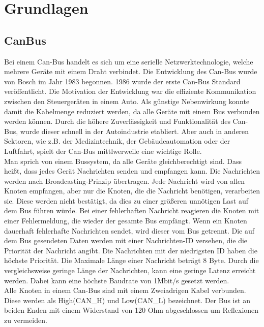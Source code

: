 \chapter{Grundlagen}


\section{CanBus}
Bei einem Can-Bus handelt es sich um eine serielle Netzwerktechnologie, 
welche mehrere Geräte mit einem Draht verbindet.
Die Entwicklung des Can-Bus wurde von Bosch im Jahr 1983 begonnen. 1986 wurde der erste Can-Bus Standard 
veröffentlicht.
Die Motivation der Entwicklung war die effiziente Kommunikation zwischen den Steuergeräten in einem Auto. 
Als günstige
Nebenwirkung konnte damit die Kabelmenge reduziert werden, da alle Geräte mit einem Bus verbunden werden können.
Durch die höhere Zuverlässigkeit und Funktionalität des Can-Bus, wurde dieser schnell in der Autoindustrie etabliert.
Aber auch in anderen Sektoren, wie z.B. der Medizintechnik, der Gebäudeautomation oder der Luftfahrt, spielt der
Can-Bus mittlwerweile eine wichtige Rolle.
\cite[Seiten 2-10]{Voss2008}
\\
Man sprich von einem Bussystem, da alle Geräte gleichberechtigt sind. Dass heißt, dass jedes Gerät Nachrichten 
senden und empfangen kann.
Die Nachrichten werden nach Broadcasting-Prinzip übertragen. Jede Nachricht wird von allen Knoten empfangen, 
aber nur die Knoten, die die Nachricht benötigen, verarbeiten sie. Diese werden nicht bestätigt,
da dies zu einer größeren unnötigen Last auf dem Bus führen würde. Bei einer fehlerhaften Nachricht reagieren
die Knoten mit einer Fehlermeldung, die wieder der gesamte Bus empfängt. Wenn ein Knoten dauerhaft fehlerhafte
Nachrichten sendet, wird dieser vom Bus getrennt. Die auf dem Bus gesendeten Daten werden mit einer Nachrichten-ID
versehen, die die Priorität der Nachricht angibt. Die Nachrichten mit der niedrigsten ID haben die höchste Priorität.
Die Maximale Länge einer Nachricht beträgt 8 Byte. Durch die vergleichsweise geringe Länge der Nachrichten, kann 
eine geringe Latenz erreicht werden. Dabei kann eine höchste Baudrate von 1Mbit/s gesetzt werden.
\cite[Seiten 13-19]{Voss2008}
\\
Alle Knoten in einem Can-Bus sind mit einem Zweiadrigen Kabel verbunden. Diese werden als High(CAN\_H) und Low(CAN\_L) 
bezeichnet. Der Bus ist an beiden Enden mit einem Widerstand von 120 Ohm abgeschlossen um Reflexionen zu vermeiden.
\cite[Seite 132]{Voss2008}
\\


